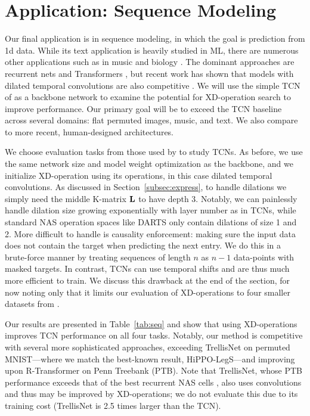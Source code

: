
\section{Application: Sequence Modeling}\label{sec:seq}

Our final application is in sequence modeling, in which the goal is prediction from 1d data.
While its text application is heavily studied in ML, there are numerous other applications such as in music \citep{allan2005chorales} and biology \citep{chen2019biological}.
The dominant approaches are recurrent nets \citep{hochreiter1997lstm} and Transformers \cite{vaswani2017attention}, but recent work has shown that models with dilated temporal convolutions are also competitive \citep{bai2018tcn,bai2019trellis}.
We will use the simple TCN of \citet{bai2018tcn} as a backbone network to examine the potential for XD-operation search to improve performance.
Our primary goal will be to exceed the TCN baseline across several domains:
flat permuted images, music, and text.
We also compare to more recent, human-designed architectures.

We choose evaluation tasks from those used by \citet{bai2018tcn} to study TCNs.
As before, we use the same network size and model weight optimization as the backbone, and we initialize XD-operation using its operations, in this case dilated temporal convolutions.
As discussed in Section~\ref{subsec:express}, to handle dilations we simply need the middle K-matrix $\mathbf{L}$ to have depth 3.
Notably, we can painlessly handle dilation size growing exponentially with layer number as in TCNs, while standard NAS operation spaces like DARTS only contain dilations of size 1 and 2.
More difficult to handle is causality enforcement: 
making sure the input data does not contain the target when predicting the next entry.
We do this in a brute-force manner by treating sequences of length $n$ as $n-1$ data-points with masked targets.
In contrast, TCNs can use temporal shifts and are thus much more efficient to train.
We discuss this drawback at the end of the section, for now noting only that it limits our evaluation of XD-operations to four smaller datasets from \citet{bai2018tcn}.

Our results are presented in Table~\ref{tab:seq} and show that using XD-operations improves TCN performance on all four tasks.
Notably, our method is competitive with several more sophisticated approaches, exceeding TrellisNet on permuted MNIST---where we match the best-known result, HiPPO-LegS---and improving upon R-Transformer on Penn Treebank (PTB).
Note that TrellisNet, whose PTB performance exceeds that of the best recurrent NAS cells \citep{bai2019trellis}, also uses convolutions and thus may be improved by XD-operations;
we do not evaluate this due to its training cost (TrellisNet is 2.5 times larger than the TCN).

